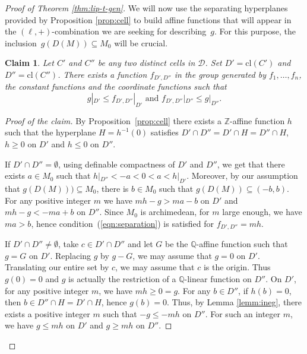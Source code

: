 \documentclass[10pt]{amsart}
\theoremstyle{definition}
\theoremstyle{remark}
\newcommand{\cl}{\mathrm{cl}}
\newcommand{\Q}{\mathbb Q}
\newcommand{\Z}{\mathbb Z}
\theoremstyle{plain}
\newtheorem{claim}[subsection]{Claim}
\theoremstyle{definition}
\begin{document}
\begin{proof}[Proof of Theorem \ref{thm:lip-t-gen}]
We will now use the separating hyperplanes provided by Proposition \ref{prop:cell}
to build affine functions that will appear in the $(\ell,+)$-combination we are seeking for describing~$g$. For this purpose,
the inclusion~$g(D(M))\subseteq M_0$ will be crucial.

\begin{claim}\label{claim:separation}
Let $C'$ and $C''$ be any two distinct cells in $\mathcal{D}$. Set $D' = \cl (C')$ and $D'' = \cl (C'')$.
There exists a function $f_{D',D''}$ in the group generated by $f_1,\ldots,f_n$, the constant functions and the coordinate functions such that\vspace*{-3pt}
\begin{equation}\label{eqn:separation}\tag{$*$}
g|_{D'}\leq f_{D',D''}|_{D'} \text{ and } f_{D',D''}|_{D''}\leq g|_{D''}.
\end{equation}
\end{claim}

\begin{proof}[Proof of the claim]
By Proposition~\ref{prop:cell} there exists a $\Z$-affine function $h$ such that the hyperplane $H =h^{-1}(0)$ satisfies $D' \cap D'' =D' \cap H=D''\cap H$, $h \geq 0$ on $D'$ and
$h \leq 0$ on $D''$.

If $D'\cap D''=\emptyset$, using definable compactness of $D'$ and $D''$, we get that there exists $a \in M_0$ such that $h|_{D''}<-a<0<a<h|_{D'}$.
Moreover, by our assumption that $g(D(M)))\subseteq M_0$, there is $b\in M_0$ such that $g(D (M)) \subseteq (-b, b)$.
For any positive integer $m$ we have $mh - g > ma - b$ on $D'$ and $mh - g < -ma + b$ on $D''$.
Since $M_0$ is archimedean, for $m$ large enough, we have $ma > b$, hence
condition~(\ref{eqn:separation}) is satisfied for $f_{D',D''} = mh$.

If $D'\cap D''\neq \emptyset$, take $c\in D'\cap D''$ and let $G$ be the $\Q$-affine function such that $g=G$ on $D'$.
Replacing $g$ by $g-G$, we may assume that $g=0$ on $D'$. Translating our entire set by $c$, we may assume that $c$ is the origin. Thus $g(0)=0$
and $g$ is actually the restriction of a $\Q$-linear function on $D''$.
On $D'$, for any positive integer $m$, we have $mh\geq0=g$.
For any $b\in D''$, if $h(b)=0$, then $b\in D''\cap H=D'\cap H$, hence $g(b)=0$.
Thus, by Lemma \ref{lemm:ineg}, there exists a positive integer $m$ such that
$-g \leq -mh$ on $D''$. For such an integer $m$, we have $g \leq mh$ on $D'$ and $g \geq mh$ on $D''$.
\end{proof}


\end{proof}
\end{document}

